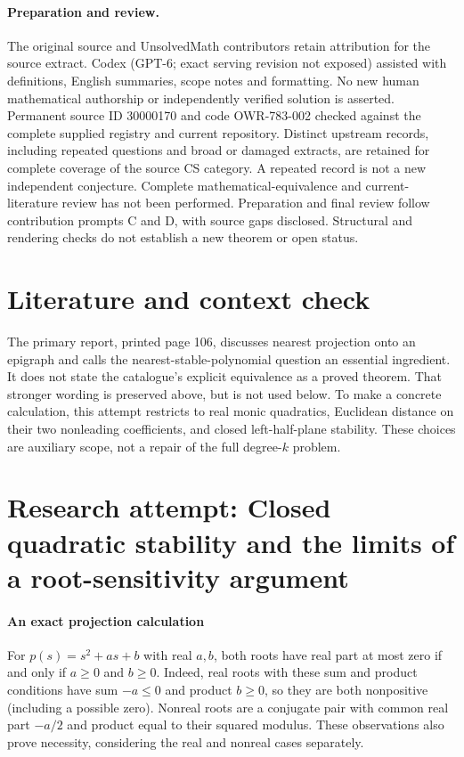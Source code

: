 \documentclass[11pt]{article}
\begin{document}
\paragraph{Preparation and review.}
The original source and UnsolvedMath contributors retain attribution for the source extract. Codex (GPT-6; exact serving revision not exposed) assisted with definitions, English summaries, scope notes and formatting. No new human mathematical authorship or independently verified solution is asserted. Permanent source ID 30000170 and code OWR-783-002 checked against the complete supplied registry and current repository. Distinct upstream records, including repeated questions and broad or damaged extracts, are retained for complete coverage of the source CS category. A repeated record is not a new independent conjecture. Complete mathematical-equivalence and current-literature review has not been performed. Preparation and final review follow contribution prompts C and D, with source gaps disclosed. Structural and rendering checks do not establish a new theorem or open status.
\label{end:30000170}

\section{Literature and context check}
The primary report, printed page 106, discusses nearest projection onto an epigraph and calls the nearest-stable-polynomial question an essential ingredient. It does not state the catalogue's explicit equivalence as a proved theorem. That stronger wording is preserved above, but is not used below. To make a concrete calculation, this attempt restricts to real monic quadratics, Euclidean distance on their two nonleading coefficients, and closed left-half-plane stability. These choices are auxiliary scope, not a repair of the full degree-$k$ problem.
\section{Research attempt: Closed quadratic stability and the limits of a root-sensitivity argument}

\paragraph{An exact projection calculation}
For $p(s)=s^2+as+b$ with real $a,b$, both roots have real part at most zero if and only if $a\geq0$ and $b\geq0$. Indeed, real roots with these sum and product conditions have sum $-a\leq0$ and product $b\geq0$, so they are both nonpositive (including a possible zero). Nonreal roots are a conjugate pair with common real part $-a/2$ and product equal to their squared modulus. These observations also prove necessity, considering the real and nonreal cases separately.
\end{document}
